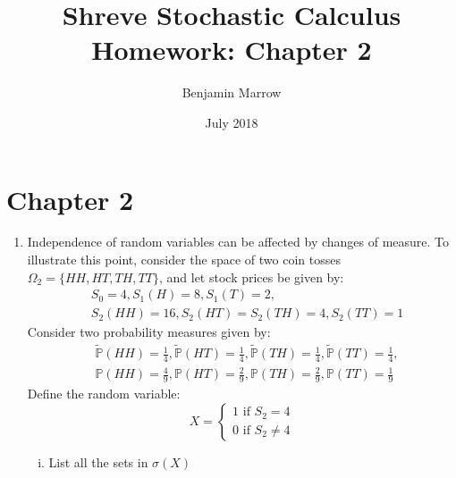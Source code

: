 \documentclass{article}
\title{Shreve Stochastic Calculus Homework: Chapter 2 \vspace{-1eX}}
\author{Benjamin Marrow \vspace{-1.5eX}}
\date{ July 2018  \vspace{-1eX}}
\makeatletter
\newcommand{\p}{\mathbb{P}}
\newcommand{\mylabel}[2]{#2\def\@currentlabel{#2}\label{#1}}
\newcommand{\pr}[1]{ \item[\mylabel{}{#1.}]}
\newcommand{\seq}[1]{\{ #1 \}}
\theoremstyle{definition}
\theoremstyle{definition}
\makeatother
\begin{document}
\maketitle


\section*{Chapter 2}

\begin{enumerate}
    \pr{2.2} Independence of random variables can be affected by changes of measure. To illustrate this point, consider the space of two coin tosses $\Omega_2 = \seq{HH,HT,TH,TT}$, and let stock prices be given by:
    \begin{align*}
       & S_0=4,S_1(H) = 8, S_1(T) = 2,  \\
       & S_2(HH) = 16, S_2(HT) = S_2(TH) = 4, S_2(TT) =1
    \end{align*}
Consider two probability measures given by:
\begin{align*}
    & \tilde{\p}(HH) = \frac{1}{4},  \tilde{\p}(HT) = \frac{1}{4},
     \tilde{\p}(TH) = \frac{1}{4},
      \tilde{\p}(TT) = \frac{1}{4}, \\
      & \p(HH) = \frac{4}{9}, 
      \p(HT) = \frac{2}{9}, 
      \p(TH) = \frac{2}{9}, 
      \p(TT) = \frac{1}{9}
\end{align*}
Define the random variable:
$$ X = \begin{cases} 1 \text{ if } S_2= 4\\ 0 \text{ if } S_2 \neq 4 \end{cases} $$

    \begin{enumerate}[(i)]
        \item List all the sets in $\sigma(X)$
        

\end{enumerate}
\end{enumerate}
\end{document}

